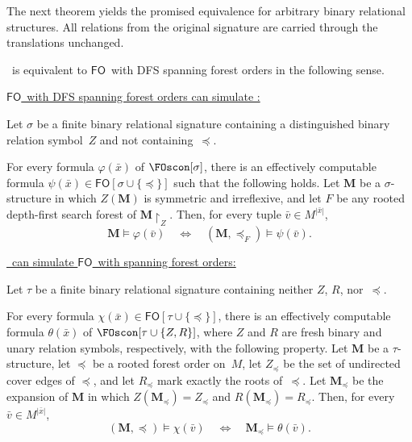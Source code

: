 \documentclass[1p,number,11pt]{elsarticle}
\theoremstyle{plain}
\newcommand{\MZ}{\mathbf M\!\upharpoonright_Z}
\renewcommand{\FO}{\ensuremath{\mathsf{FO}}}
\begin{document}
The next theorem yields the promised equivalence for arbitrary binary
relational structures.  All relations from the original signature are
carried through the translations unchanged.

\begin{theorem}[store={thm:scon=FOFO},
    restate-keys={note=see \zcpageref[nocap]{thm:scon=FOFO}}]
\mbox{}
\smallskip

\FOscon~is equivalent to \FO~with DFS spanning forest orders in the following sense.
\medskip

\noindent
\textup{\underline{\FO~with DFS spanning forest orders can simulate \FOscon:}}
\smallskip

\noindent
Let $\sigma$ be a finite binary relational signature containing a
distinguished binary relation symbol~$Z$ and not containing~$\preceq$.

For every formula $\varphi(\bar x)$ of $\FOscon[\sigma]$, there is an
effectively computable formula
$\psi(\bar x)\in\FO[\sigma\cup\{\preceq\}]$ such that the following holds.
Let $\mathbf M$ be a $\sigma$-structure in which $Z(\mathbf M)$ is symmetric
and irreflexive, and let $F$ be any rooted depth-first search forest of
$\MZ$. Then, for every tuple
$\bar v\in M^{|\bar x|}$,
\[
   \mathbf M\models\varphi(\bar v)
   \quad\Longleftrightarrow\quad
   (\mathbf M,\preceq_F)\models\psi(\bar v).
\]
\medskip

\noindent

\textup{\underline{\FOscon~can simulate \FO~with spanning forest orders:}}

\smallskip

\noindent
Let $\tau$ be a finite binary
relational signature containing neither $Z$, $R$, nor~$\preceq$.

For every formula
$\chi(\bar x)\in\FO[\tau\cup\{\preceq\}]$, there is an
effectively computable formula $\theta(\bar x)$ of
$\FOscon[\tau\cup\{Z,R\}]$, where $Z$ and $R$ are fresh binary and unary
relation symbols, respectively, with the
following property. Let $\mathbf M$ be a $\tau$-structure, let $\preceq$ be a
rooted forest order on~$M$, let $Z_\preceq$ be the set of undirected cover edges
of $\preceq$, 
and let $R_\preceq$ mark exactly the roots of~$\preceq$.
Let $\mathbf M_\preceq$ be the expansion of $\mathbf M$ in which
$ Z(\mathbf M_\preceq)=Z_\preceq$ and $R(\mathbf M_\preceq)=R_\preceq$.
Then, for every $\bar v\in M^{|\bar x|}$,
\[
   (\mathbf M,\preceq)\models\chi(\bar v)
   \quad\Longleftrightarrow\quad
   \mathbf M_\preceq\models\theta(\bar v).
\]
\end{theorem}
\end{document}
